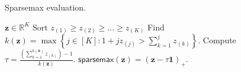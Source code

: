 \begin{algorithm}[t]
\caption{Sparsemax evaluation.}
\label{alg:sparsemax}
\begin{algorithmic}[1]
\Require $\bm{z} \in \mathbb{R}^K$
\State Sort $z_{(1)} \ge z_{(2)} \ge ... \ge z_{(K)}$
\State Find $k(\bm{z}) = \max \left\{j \in [K] : 1 + jz_{(j)} > \sum_{k=1}^j z_{(k)} \right\}$. \label{alg:sparsemax_line_k}
\State Compute $\tau = \frac{\left(\sum_{k=1}^{k(\bm{z})} z_{(k)} \right) - 1}{k(\bm{z})}$. 
\State \Return $\mathsf{sparsemax}(\bm{z}) = (\bm{z} - \tau \bm{1})_+$. 
\end{algorithmic}
\end{algorithm}